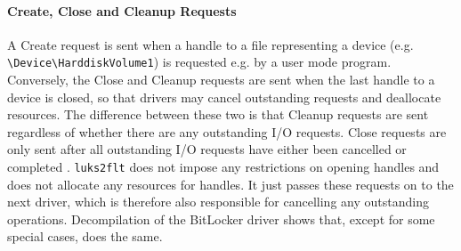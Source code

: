 
\paragraph{Create, Close and Cleanup Requests} A Create request is sent when a handle to a file representing a device (e.g. \texttt{\textbackslash Device\textbackslash HarddiskVolume1}) is requested e.g. by a user mode program. Conversely, the Close and Cleanup requests are sent when the last handle to a device is closed, so that drivers may cancel outstanding requests and deallocate resources. The difference between these two is that Cleanup requests are sent regardless of whether there are any outstanding I/O requests. Close requests are only sent after all outstanding I/O requests have either been cancelled or completed \cite{Kerneldriver}. \texttt{luks2flt} does not impose any restrictions on opening handles and does not allocate any resources for handles. It just passes these requests on to the next driver, which is therefore also responsible for cancelling any outstanding operations. Decompilation of the BitLocker driver shows that, except for some special cases, does the same.

